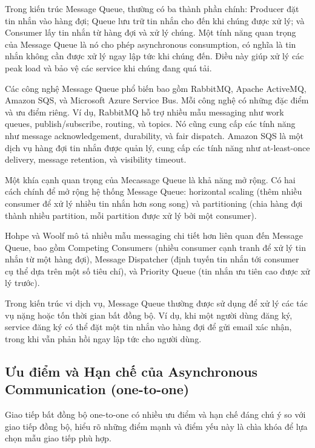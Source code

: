 Trong kiến trúc Message Queue, thường có ba thành phần chính: Producer đặt tin nhắn vào hàng đợi; Queue lưu trữ tin nhắn cho đến khi chúng được xử lý; và Consumer lấy tin nhắn từ hàng đợi và xử lý chúng. Một tính năng quan trọng của Message Queue là nó cho phép asynchronous consumption, có nghĩa là tin nhắn không cần được xử lý ngay lập tức khi chúng đến. Điều này giúp xử lý các peak load và bảo vệ các service khi chúng đang quá tải.

Các công nghệ Message Queue phổ biến bao gồm RabbitMQ, Apache ActiveMQ, Amazon SQS, và Microsoft Azure Service Bus. Mỗi công nghệ có những đặc điểm và ưu điểm riêng. Ví dụ, RabbitMQ hỗ trợ nhiều mẫu messaging như work queues, publish/subscribe, routing, và topics. Nó cũng cung cấp các tính năng như message acknowledgement, durability, và fair dispatch. Amazon SQS là một dịch vụ hàng đợi tin nhắn được quản lý, cung cấp các tính năng như at-least-once delivery, message retention, và visibility timeout.

Một khía cạnh quan trọng của Mecassage Queue là khả năng mở rộng. Có hai cách chính để mở rộng hệ thống Message Queue: horizontal scaling (thêm nhiều consumer để xử lý nhiều tin nhắn hơn song song) và partitioning (chia hàng đợi thành nhiều partition, mỗi partition được xử lý bởi một consumer).

Hohpe và Woolf \cite{hohpe2004} mô tả nhiều mẫu messaging chi tiết hơn liên quan đến Message Queue, bao gồm Competing Consumers (nhiều consumer cạnh tranh để xử lý tin nhắn từ một hàng đợi), Message Dispatcher (định tuyến tin nhắn tới consumer cụ thể dựa trên một số tiêu chí), và Priority Queue (tin nhắn ưu tiên cao được xử lý trước).

Trong kiến trúc vi dịch vụ, Message Queue thường được sử dụng để xử lý các tác vụ nặng hoặc tốn thời gian bất đồng bộ. Ví dụ, khi một người dùng đăng ký, service đăng ký có thể đặt một tin nhắn vào hàng đợi để gửi email xác nhận, trong khi vẫn phản hồi ngay lập tức cho người dùng.

\subsection{Ưu điểm và Hạn chế của Asynchronous Communication (one-to-one)}
Giao tiếp bất đồng bộ one-to-one có nhiều ưu điểm và hạn chế đáng chú ý so với giao tiếp đồng bộ, hiểu rõ những điểm mạnh và điểm yếu này là chìa khóa để lựa chọn mẫu giao tiếp phù hợp.

